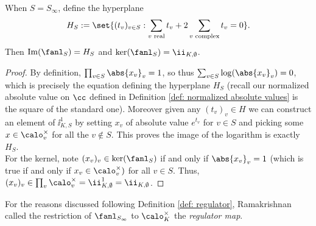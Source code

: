 \documentclass[11pt, x11names, openany]{book}
\begin{document}
\begin{lemma}
\label{lemma: idelic log map}
 When $S = S_\infty$, define the hyperplane
 \begin{equation*}
    H_S := \set{(t_v)_{v \in S} : \sum_{v \text{ real}} t_v + 2 \sum_{v \text{ complex}} t_v = 0}.
 \end{equation*}
 Then $\image(\fanl_S) = H_S$ and $\ker(\fanl_S) = \ii_{K, \emptyset}$.
\end{lemma}
\begin{proof}
By definition, $\prod_{v \in S} \abs{x_v}_v = 1$, so thus $\sum_{v \in S} \log(\abs{x_v}_v) = 0$, which is precisely the equation defining the hyperplane $H_S$ (recall our normalized absolute value on $\cc$ defined in Definition \ref{def: normalized absolute values} is the square of the standard one). Moreover given any $(t_v)_v \in H$ we can construct an element of $\ii^1_{K, S}$ by setting $x_v$ of absolute value $e^{t_v}$ for $v \in S$ and picking some $x \in \calo_v^\times$ for all the $v \notin S$. This proves the image of the logarithm is exactly $H_S$.\\
For the kernel, note $(x_v)_v \in \ker(\fanl_S)$ if and only if $\abs{x_v}_v = 1$ (which is true if and only if $x_v \in \calo_v^\times)$ for all $v \in S$. Thus, $(x_v)_v \in \prod_{v} \calo_v^\times = \ii^1_{K, \emptyset} = \ii_{K, \emptyset}$.
\end{proof}

\begin{remark}
    For the reasons discussed following Definition \ref{def: regulator}, Ramakrishnan \cite{ramakrishnan1998fourier} called the restriction of $\fanl_{S_\infty}$ to $\calo_K^\times$ the \textit{regulator map}.
\end{remark}
\end{document}
